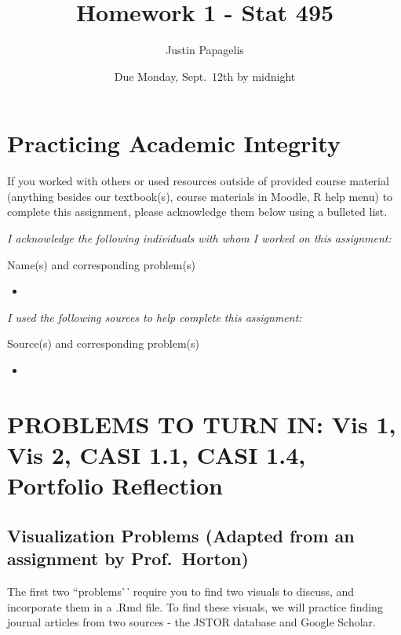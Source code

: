 \documentclass[
]{article}
\title{Homework 1 - Stat 495}
\author{Justin Papagelis}
\date{Due Monday, Sept.~12th by midnight}
\providecommand{\tightlist}{%
  \setlength{\itemsep}{0pt}\setlength{\parskip}{0pt}}
\begin{document}
\maketitle

\hypertarget{practicing-academic-integrity}{%
\section{Practicing Academic
Integrity}\label{practicing-academic-integrity}}

If you worked with others or used resources outside of provided course
material (anything besides our textbook(s), course materials in Moodle,
R help menu) to complete this assignment, please acknowledge them below
using a bulleted list.

\emph{I acknowledge the following individuals with whom I worked on this
assignment:}

Name(s) and corresponding problem(s)

\begin{itemize}
\tightlist
\item
\end{itemize}

\emph{I used the following sources to help complete this assignment:}

Source(s) and corresponding problem(s)

\begin{itemize}
\tightlist
\item
\end{itemize}

\newpage

\hypertarget{problems-to-turn-in-vis-1-vis-2-casi-1.1-casi-1.4-portfolio-reflection}{%
\section{PROBLEMS TO TURN IN: Vis 1, Vis 2, CASI 1.1, CASI 1.4,
Portfolio
Reflection}\label{problems-to-turn-in-vis-1-vis-2-casi-1.1-casi-1.4-portfolio-reflection}}

\hypertarget{visualization-problems-adapted-from-an-assignment-by-prof.-horton}{%
\subsection{Visualization Problems (Adapted from an assignment by
Prof.~Horton)}\label{visualization-problems-adapted-from-an-assignment-by-prof.-horton}}

The first two ``problems'\,' require you to find two visuals to discuss,
and incorporate them in a .Rmd file. To find these visuals, we will
practice finding journal articles from two sources - the JSTOR database
and Google Scholar.
\end{document}

